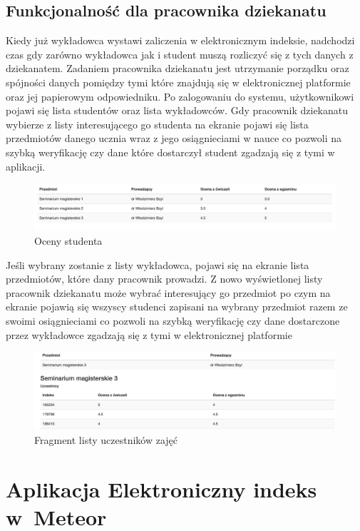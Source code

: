 \documentclass[brudnopis]{xmgr}
\begin{document}
\section{Funkcjonalność dla pracownika dziekanatu}

Kiedy już wykładowca wystawi zaliczenia w elektronicznym indeksie, nadchodzi czas gdy zarówno wykładowca jak i student muszą rozliczyć się z tych danych z dziekanatem. Zadaniem pracownika dziekanatu jest utrzymanie porządku oraz spójności danych pomiędzy tymi które znajdują się w elektronicznej platformie oraz jej papierowym odpowiedniku. Po zalogowaniu do systemu, użytkownikowi pojawi się lista studentów oraz lista wykładowców. Gdy pracownik dziekanatu  wybierze z listy interesującego go studenta na ekranie pojawi się lista przedmiotów danego ucznia wraz z jego osiągnieciami w nauce co pozwoli na szybką weryfikację czy dane które dostarczył student zgadzają się z tymi w aplikacji.

\begin{figure}[th!]
\centering
\includegraphics[width=0.7\hsize]{images/studentGrades} 
\caption{Oceny studenta\label{RYS.13}}
\end{figure}
 
Jeśli wybrany zostanie z listy wykładowca, pojawi się na ekranie lista przedmiotów, które dany pracownik prowadzi. Z nowo wyświetlonej listy pracownik dziekanatu może wybrać interesujący go przedmiot po czym na ekranie pojawią się wszyscy studenci zapisani na wybrany przedmiot razem ze swoimi osiągnieciami co pozwoli na szybką weryfikację czy dane dostarczone przez wykładowce zgadzają się z tymi w elektronicznej platformie

 \begin{figure}[th!]
\centering
\includegraphics[width=0.61\hsize]{images/deaneryList} 
\caption{Fragment listy uczestników zajęć\label{RYS.14}}
\end{figure}

\chapter{Aplikacja Elektroniczny indeks w~Meteor}
\end{document}
